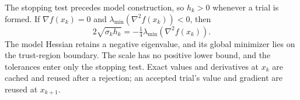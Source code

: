 The stopping test precedes model construction, so $h_k>0$ whenever
a trial is formed. If $\nabla f(x_k)=0$ and
$\lambda_{\min}(\nabla^2 f(x_k))<0$, then
\[
 2\sqrt{\sigma_kh_k}=-\tfrac14\lambda_{\min}(\nabla^2 f(x_k)).
\]
The model Hessian retains a negative eigenvalue, and its global
minimizer lies on the trust-region boundary. The scale has no positive
lower bound, and the tolerances enter only the stopping test.
Exact values and derivatives at $x_k$ are cached and reused after a
rejection; an accepted trial's value and gradient are reused at
$x_{k+1}$.
